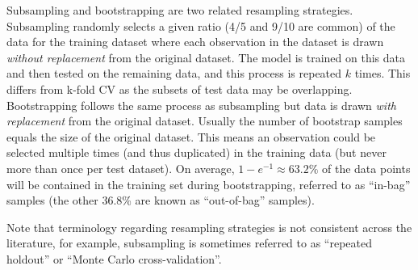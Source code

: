Subsampling
and bootstrapping are two related resampling
strategies. Subsampling randomly selects a given ratio (4/5 and 9/10 are
common) of the data for the training dataset where each observation in
the dataset is drawn \emph{without replacement} from the original
dataset. The model is trained on this data and then tested on the
remaining data, and this process is repeated \(k\) times. This differs
from k-fold CV as the subsets of test data may be overlapping.
Bootstrapping follows the same process as subsampling but data is drawn
\emph{with replacement} from the original dataset. Usually the number of
bootstrap samples equals the size of the original dataset. This means an
observation could be selected multiple times (and thus duplicated) in
the training data (but never more than once per test dataset). On
average, \(1 - e^{-1} \approx 63.2\%\) of the data points will be
contained in the training set during bootstrapping, referred to as
``in-bag'' samples (the other 36.8\% are known as ``out-of-bag''
samples).

Note that terminology regarding resampling strategies is not consistent
across the literature, for example, subsampling is sometimes referred to
as ``repeated holdout''  or
``Monte Carlo
cross-validation''.

